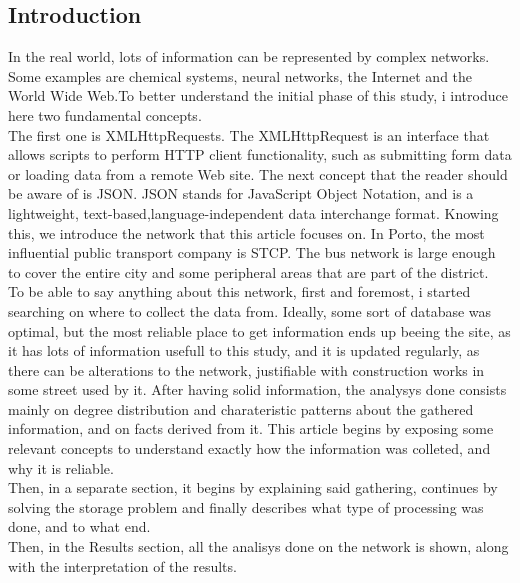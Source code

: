 \documentclass[12pt]{article}
\begin{document}
\begin{multicols}{2}
\section{Introduction}
In the real world, lots of information can be represented by complex networks. Some examples are chemical systems, neural networks, the Internet and the World Wide Web\cite{boccaletti2006complex}.To better understand the initial phase of this study, i introduce here two fundamental concepts.\\
The first one is XMLHttpRequests. The XMLHttpRequest is an interface that allows scripts to perform HTTP client functionality, such as submitting form data or loading data from a remote Web site\cite{van2007xmlhttprequest}.
The next concept that the reader should be aware of is JSON. JSON stands for JavaScript Object Notation, and is a lightweight, text-based,language-independent data interchange format\cite{crockford2006application}. Knowing this, we introduce the network that this article focuses on.
In Porto, the most influential public transport company is STCP. The bus network is large enough to cover the entire city and some peripheral areas that are part of the district.\\
To be able to say anything about this network, first and foremost, i started searching on where to collect the data from. Ideally, some sort of database was optimal, but the most reliable place to get information ends up beeing the site, as it has lots of information usefull to this study, and it is updated regularly, as there can be alterations to the network, justifiable with construction works in some street used by it.
After having solid information, the analysys done consists mainly on degree distribution and charateristic patterns about the gathered information, and on facts derived from it.
This article begins by exposing some relevant concepts to understand exactly how the information was colleted, and why it is reliable.\\
Then, in a separate section, it begins by explaining said gathering, continues by solving the storage problem and finally describes what type of processing was done, and to what end.\\
Then, in the Results section, all the analisys done on the network is shown, along with the interpretation of the results.


\end{multicols}
\end{document}
